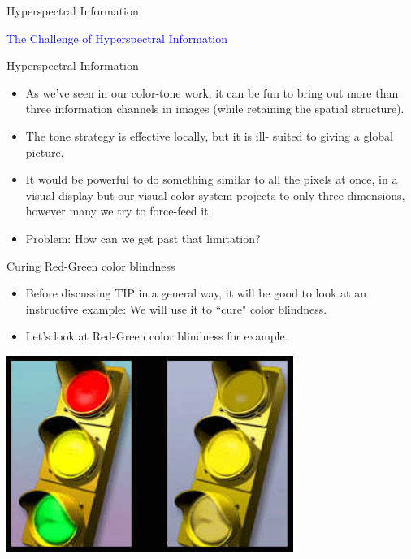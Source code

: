 \documentclass{beamer}
\begin{document}
\begin{frame}{Hyperspectral Information}
   \begin{center}
      \Huge \textcolor{blue}{The Challenge of Hyperspectral Information}
   \end{center}
\end{frame}

\begin{frame}{Hyperspectral Information}
   \begin{itemize}
      \item As we've seen in our color-tone work, it can be fun to bring out more than three information channels in images (while retaining the spatial structure).
      \item The tone strategy is effective locally, but it is ill- suited to giving a global picture.
      \item It would be powerful to do something similar to all the pixels at once, in a visual display but our visual color system projects to only three dimensions, however many we try to force-feed it.
      \item Problem: How can we get past that limitation?
   \end{itemize}
\end{frame}

\begin{frame}{Curing Red-Green color blindness}
   \begin{itemize}
      \item Before discussing TIP in a general way, it will be good to look at an instructive example: We will use it to ``cure" color blindness.
      \item Let's look at Red-Green color blindness for example.
   \end{itemize}
   \begin{center}
      \includegraphics[width=0.7\textwidth]{figures/stoplight.jpg}
   \end{center}
\end{frame}
\end{document}

